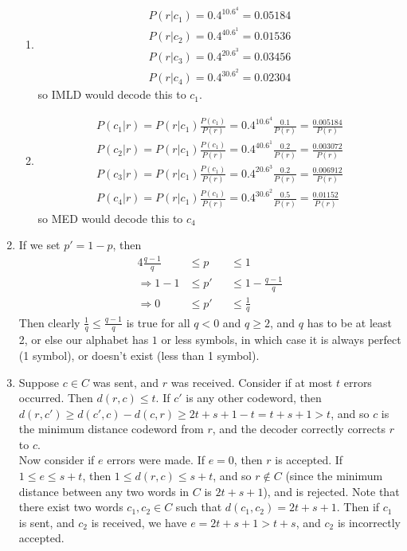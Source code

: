 \documentclass[10pt,english]{article}
\begin{document}
\begin{enumerate}
\begin{enumerate}
    \item \begin{align*}
        P(r|c_1)=0.4^10.6^4= 0.05184\\
        P(r|c_2)=0.4^40.6^1= 0.01536\\
        P(r|c_3)=0.4^20.6^3= 0.03456\\
        P(r|c_4)=0.4^30.6^2= 0.02304
        \end{align*}
        so IMLD would decode this to $c_1$. 


    \item \begin{align*}
        P(c_1|r)=P(r|c_1)\frac{P(c_1)}{P(r)}=0.4^10.6^4\frac{0.1}{P(r)}=\frac{0.005184}{P(r)}\\
        P(c_2|r)=P(r|c_1)\frac{P(c_1)}{P(r)}=0.4^40.6^1\frac{0.2}{P(r)}=\frac{0.003072}{P(r)}\\
        P(c_3|r)=P(r|c_1)\frac{P(c_1)}{P(r)}=0.4^20.6^3\frac{0.2}{P(r)}=\frac{0.006912}{P(r)}\\
        P(c_4|r)=P(r|c_1)\frac{P(c_1)}{P(r)}=0.4^30.6^2\frac{0.5}{P(r)}=\frac{0.01152}{P(r)}
        \end{align*}
        so MED would decode this to $c_4$ 
    
\end{enumerate}

\pagebreak
\item If we set $p'=1-p$, then 
    \begin{alignat*}{4}
        \frac{q-1}{q}&\leq p&&\leq1\\
        \Rightarrow 1-1&\leq p' &&\leq1-\frac{q-1}{q}\\
        \Rightarrow 0&\leq p'&&\leq\frac{1}{q}
    \end{alignat*}
Then clearly $\frac{1}{q}\leq\frac{q-1}{q}$ is true for all $q<0$ and $q\geq2$, and $q$ has to be at least 2, or else our alphabet has $1$ or less symbols, in which case it is always perfect (1 symbol), or doesn't exist (less than 1 symbol). 
    


\pagebreak
\item Suppose $c\in C$ was sent, and $r$ was received. Consider if at most $t$ errors occurred. Then $d(r,c)\leq t$. If $c'$ is any other codeword, then $d(r,c')\geq d(c',c)-d(c,r)\geq 2t+s+1-t=t+s+1>t$, and so $c$ is the minimum distance codeword from $r$, and the decoder correctly corrects $r$ to $c$. \\ 
Now consider if $e$ errors were made. If $e=0$, then $r$ is accepted. If $1\leq e\leq s+t$, then $1\leq d(r,c)\leq s+t$, and so $r\not\in C$ (since the minimum distance between any two words in $C$ is $2t+s+1$), and is rejected. Note that there exist two words $c_1,c_2\in C$ such that $d(c_1,c_2)=2t+s+1$. Then if $c_1$ is sent, and $c_2$ is received, we have $e=2t+s+1>t+s$, and $c_2$ is incorrectly accepted.  



\end{enumerate}
\end{document}
